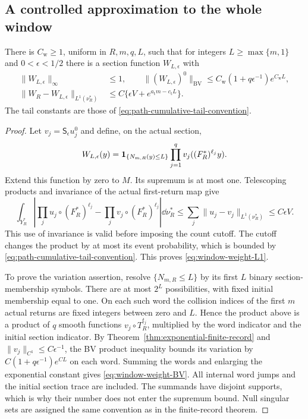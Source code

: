 \subsection{A controlled approximation to the whole window}
\begin{lemma}
\label{lem:window-weight-approximation}
There is $C_{\mathrm w}\ge1$, uniform in $R,m,q,L$, such that for
integers $L\ge\max\{m,1\}$ and $0<\epsilon<1/2$ there is a section
function $W_{L,\epsilon}$ with
\begin{align}
 \|W_{L,\epsilon}\|_\infty&\le1,\qquad
 \|(W_{L,\epsilon})^0\|_{\mathrm{BV}}
       \le C_{\mathrm w}(1+q\epsilon^{-1})e^{C_{\mathrm w}L},
       \label{eq:window-weight-BV}\\
 \|W_R-W_{L,\epsilon}\|_{L^1(\nu_R^*)}
       &\le C\{\epsilon V+e^{a_{\mathrm t}m-c_{\mathrm t}L}\}.
       \label{eq:window-weight-L1}
\end{align}
The tail constants are those of
\eqref{eq:path-cumulative-tail-convention}.
\end{lemma}
\begin{proof}
Let $v_j=\mathsf S_\epsilon u_j^0$ and define, on the actual section,
\[
 W_{L,\epsilon}(y)=\mathbf1_{\{N_{m,R}(y)\le L\}}
                \prod_{j=1}^{q}v_j((F_R^*)^{\ell_j}y).
\]
Extend this function by zero to $M$. Its supremum is at most one.
Telescoping products and invariance of the actual first-return map give
\[
 \int_{Y_R^*}\left|
  \prod_j u_j\circ(F_R^*)^{\ell_j}
  -\prod_j v_j\circ(F_R^*)^{\ell_j}\right|\dd\nu_R^*
 \le \sum_j\|u_j-v_j\|_{L^1(\nu_R^*)}\le C\epsilon V.
\]
This use of invariance is valid before imposing the count cutoff.
The cutoff changes the product by at most its event probability, which
is bounded by \eqref{eq:path-cumulative-tail-convention}. This proves
\eqref{eq:window-weight-L1}.

To prove the variation assertion, resolve $\{N_{m,R}\le L\}$ by
its first $L$ binary section-membership symbols. There are at most
$2^L$ possibilities, with fixed initial membership equal to one. On
each such word the collision indices of the first $m$ actual returns
are fixed integers between zero and $L$. Hence the product above
is a product of $q$ smooth functions $v_j\circ T_R^{t_j}$, multiplied
by the word indicator and the initial section indicator. By
Theorem~\ref{thm:exponential-finite-record} and
$\|v_j\|_{C^1}\le C\epsilon^{-1}$, the BV product inequality bounds
its variation by $C(1+q\epsilon^{-1})e^{CL}$ on each word.
Summing the words and enlarging the exponential constant gives
\eqref{eq:window-weight-BV}. All internal word jumps and the initial
section trace are included. The summands have disjoint supports, which
is why their number does not enter the supremum bound. Null singular
sets are assigned the same convention as in the finite-record theorem.
\end{proof}

